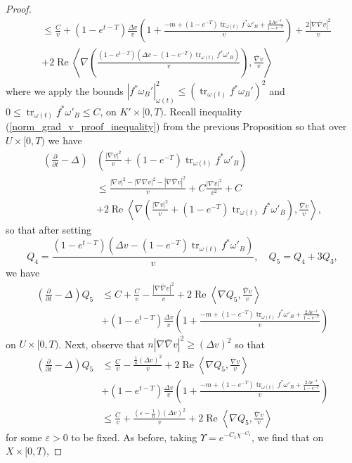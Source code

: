 \documentclass[12pt]{article}
\numberwithin{equation}{section}
\renewcommand{\d}{\partial}
\newcommand{\e}{\varepsilon}
\DeclareMathOperator{\tr}{tr}
\DeclareMathOperator{\Real}{Re}
\newcommand{\oo}[1]{\overline{#1}}
\newcommand{\parabolic}[1]{\left(\frac{\d}{\d t} - \Delta_{#1}\right)}
\newcommand{\ip}[1]{\left\langle#1\right\rangle}
\begin{document}
\begin{proof}
\begin{align*}
    &\leq \frac{C}{v} + (1-e^{t-T}) \frac{\Delta v }{v} \left(1+\frac{-m+(1-e^{-T})\tr_{\omega(t)}f^*\omega'_B + \frac{2A e^{-t}}{1-e^{-T}}}{v}\right)+\frac{2|\nabla \oo{\nabla} v|^2}{v}\\
    &+ 2\Real \ip{\nabla \left(\frac{(1-e^{t-T})(\Delta v - (1-e^{-T})\tr_{\omega(t)} f^*\omega'_B)}{v}\right), \frac{\oo{\nabla} v}{v}}
\end{align*}
where we apply the bounds $|f^*\omega_B'|_{\omega(t)}^2 \leq (\tr_{\omega(t)}f^*\omega_B')^2$ and $0 \leq \tr_{\omega(t)} f^*\omega'_B \leq C$, on $K' \times [0,T)$. Recall inequality (\ref{norm_grad_v_proof_inequality}) from the previous Proposition so that over $U \times [0,T)$ we have
\begin{align*}
    \parabolic{}&\left(\frac{|\nabla v|^2}{v} + (1-e^{-T})\tr_{\omega(t)} f^*\omega'_B\right)\\
    &\leq \frac{|\nabla v|^2 - |\nabla \nabla v|^2 - |\nabla \oo{\nabla} v|^2}{v}+ C\frac{|\nabla v|^2}{v^2} + C\\
    &+ 2 \Real \ip{\nabla \left(\frac{|\nabla v|^2}{v}+ (1-e^{-T})\tr_{\omega(t)} f^*\omega'_B \right), \frac{\oo{\nabla} v}{v}},
\end{align*}
so that after setting 
\begin{equation*}
    Q_4 = \frac{(1-e^{t-T})(\Delta v - (1-e^{-T})\tr_{\omega(t)} f^*\omega'_B)}{v}, \quad Q_5 = Q_4 + 3 Q_3,
\end{equation*}
we have
\begin{align*}
    \parabolic{}Q_5 &\leq C + \frac{C}{v}-\frac{|\nabla \oo{\nabla} v|^2}{v} + 2\Real \ip{\nabla Q_5, \frac{\oo{\nabla} v}{v}}\\
    &+(1-e^{t-T}) \frac{\Delta v }{v} \left(1 + \frac{-m+(1-e^{-T})\tr_{\omega(t)}f^*\omega'_B + \frac{2A e^{-t}}{1-e^{-T}}}{v}\right)
\end{align*}
on $U \times [0,T)$. Next, observe that $n|\nabla \oo{\nabla} v|^2 \geq (\Delta v)^2$ so that
\begin{align*}
    \parabolic{} Q_5 &\leq \frac{C}{v} -\frac{\frac{1}{n}(\Delta v)^2}{v} + 2\Real \ip{\nabla Q_5, \frac{\oo{\nabla} v}{v}}\\
    &+ (1-e^{t-T}) \frac{\Delta v }{v} \left(1+\frac{-m+(1-e^{-T})\tr_{\omega(t)}f^*\omega'_B + \frac{2A e^{-t}}{1-e^{-T}}}{v}\right)\\
    &\leq \frac{C}{v} + \frac{(\e-\frac{1}{n})(\Delta v)^2}{v} + 2 \Real \ip{\nabla Q_5, \frac{\oo{\nabla} v}{v}}
\end{align*}
for some $\e > 0$ to be fixed. As before, taking $\Upsilon = e^{-C_1\chi^{-C_2}}$, we find that on $X \times [0,T)$,

\end{proof}
\end{document}
